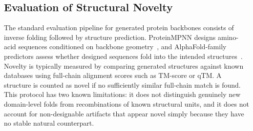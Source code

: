 \documentclass[letterpaper]{article} %
\begin{document}



\subsection{Evaluation of Structural Novelty}

The standard evaluation pipeline for generated protein backbones consists of inverse folding followed by structure prediction. ProteinMPNN designs amino-acid sequences conditioned on backbone geometry~\cite{dauparas2022proteinmpnn}, and AlphaFold-family predictors assess whether designed sequences fold into the intended structures~\cite{jumper2021alphafold,abramson2024alphafold3}. Novelty is typically measured by comparing generated structures against known databases using full-chain alignment scores such as TM-score or qTM. A structure is counted as novel if no sufficiently similar full-chain match is found. This protocol has two known limitations: it does not distinguish genuinely new domain-level folds from recombinations of known structural units, and it does not account for non-designable artifacts that appear novel simply because they have no stable natural counterpart.
\end{document}
